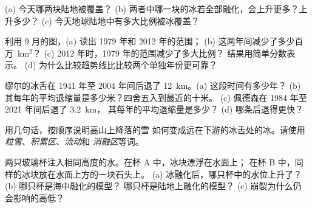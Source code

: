 \begin{exercise}[$\star$]\label{exo:g8:ice-on-earth:4}
(a) 今天哪两块陆地被覆盖？
(b) 两者中哪一块的冰若全部融化，会上升更多？上升多少？
(c) 今天地球陆地中有多大比例被冰覆盖？
\end{exercise}

\begin{exercise}[$\star\star$]\label{exo:g8:ice-on-earth:5}
利用 9 月的图，(a) 读出 1979 年和 2012 年的范围；
(b) 这两年间减少了多少百万~km$^2$？
(c) 2012 年时，1979 年的范围减少了多大比例？
结果用简单分数表示。
(d) 为什么比较趋势线比比较两个单独年份更可靠？
\end{exercise}

\begin{exercise}[$\star\star$]\label{exo:g8:ice-on-earth:6}
缪尔的冰舌在 1941 年至 2004 年间后退了 \qty{12}{km}。(a) 这段时间有多少年？
(b) 其每年的平均退缩量是多少米？四舍五入到最近的十米。
(c) 佩德森在 1984 年至 2021 年间后退了 \qty{3.2}{km}，
其每年的平均退缩量是多少？
(d) 哪条后退得更快？
\end{exercise}

\begin{exercise}[$\star\star$]\label{exo:g8:ice-on-earth:7}
用几句话，按顺序说明高山上降落的雪
如何变成远在下游的冰舌处的冰。请使用
\emph{粒雪}、\emph{积累区}、\emph{流动}和
\emph{消融区}等词。
\end{exercise}

\begin{exercise}[$\star\star$]\label{exo:g8:ice-on-earth:8}
两只玻璃杯注入相同高度的水。在杯 A 中，冰块漂浮在水面上；
在杯 B 中，同样的冰块放在水面上方的一块石头上。
(a) 冰融化后，哪只杯中的水位上升了？(b) 哪只杯是海中融化的模型？
哪只杯是陆地上融化的模型？
(c) 崩裂为什么仍
会影响的高低？
\end{exercise}

